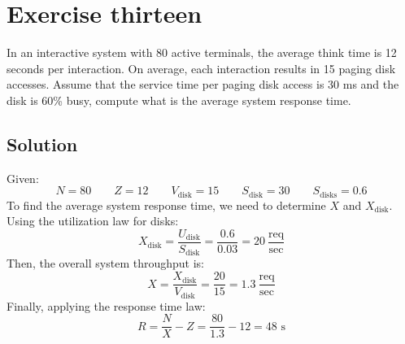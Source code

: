 \section{Exercise thirteen}

In an interactive system with 80 active terminals, the average think time is 12 seconds per interaction. 
On average, each interaction results in 15 paging disk accesses. 
Assume that the service time per paging disk access is 30 ms and the disk is 60\% busy, compute what is the average system response time.

\subsection*{Solution}
Given:
\[N=80\qquad Z=12 \qquad V_{\text{disk}}=15 \qquad S_{\text{disk}}=30\qquad S_{\text{disks}}=0.6\]
To find the average system response time, we need to determine $X$ and $X_{\text{disk}}$. 
Using the utilization law for disks:
\[X_{\text{disk}}=\dfrac{U_{\text{disk}}}{S_{\text{disk}}}=\dfrac{0.6}{0.03}=20\:\dfrac{\text{req}}{\text{sec}}\]
Then, the overall system throughput is:
\[X=\dfrac{X_{\text{disk}}}{V_{\text{disk}}}=\dfrac{20}{15}=1.3\:\dfrac{\text{req}}{\text{sec}}\]
Finally, applying the response time law:
\[R=\dfrac{N}{X}-Z=\dfrac{80}{1.3}-12=48\text{ s}\]